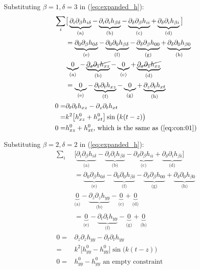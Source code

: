\documentclass[]{article}
\begin{document}
Substituting $\beta=1,\delta=3$ in (\ref{eq:expanded_h}):
\begin{align*}
	\sum_i&\big[\underbrace{\partial_i\partial_\beta h_{i\delta}}_\text{(a)} - \underbrace{\partial_i\partial_i h_{\beta\delta}}_\text{(b)} -  \underbrace{\partial_\delta\partial_\beta h_{ii}}_\text{(c)} + \underbrace{\partial_\delta\partial_i h_{\beta i}}_\text{(d)}\big]\\
	&=\underbrace{\partial_0\partial_\beta h_{0\delta}}_\text{(e)} - \underbrace{\partial_0\partial_0 h_{\beta\delta}}_\text{(f)} -  \underbrace{\partial_\delta\partial_\beta h_{00}}_\text{(g)} + \underbrace{\partial_\delta\partial_0 h_{\beta 0}}_\text{(h)}\\
	&\underbrace{0}_\text{(a)} - \underbrace{\cancel{\partial_z\partial_z h_{xz}}}_\text{(b)} -  \underbrace{0}_\text{(c)} + \underbrace{\cancel{\partial_z\partial_z h_{x z}}}_\text{(d)}\\
	&=\underbrace{0}_\text{(e)} - \underbrace{\partial_t\partial_t h_{xz}}_\text{(f)} -  \underbrace{0}_\text{(g)} + \underbrace{\partial_z\partial_t h_{xt}}_\text{(h)}\\
	0=&\partial_t\partial_t h_{xz}-\partial_z\partial_t h_{xt}\\
	=&k^2 \big[h^0_{xz}+h^0_{xt}\big] \sin\big(k(t-z)\big)\\
	0=&h^0_{xz}+h^0_{xt} \text{, which is the same as (\ref{eq:con:01})}
\end{align*}

Substituting $\beta=2,\delta=2$ in (\ref{eq:expanded_h}):
\begin{align*}
	\sum_i&\big[\underbrace{\partial_i\partial_\beta h_{i\delta}}_\text{(a)} - \underbrace{\partial_i\partial_i h_{\beta\delta}}_\text{(b)} -  \underbrace{\partial_\delta\partial_\beta h_{ii}}_\text{(c)} + \underbrace{\partial_\delta\partial_i h_{\beta i}}_\text{(d)}\big]\\
	&=\underbrace{\partial_0\partial_\beta h_{0\delta}}_\text{(e)} - \underbrace{\partial_0\partial_0 h_{\beta\delta}}_\text{(f)} -  \underbrace{\partial_\delta\partial_\beta h_{00}}_\text{(g)} + \underbrace{\partial_\delta\partial_0 h_{\beta 0}}_\text{(h)}\\
	&\underbrace{0}_\text{(a)} - \underbrace{\partial_z\partial_z h_{yy}}_\text{(b)} -  \underbrace{0}_\text{(c)} + \underbrace{0}_\text{(d)}\\
	&=\underbrace{0}_\text{(e)} - \underbrace{\partial_t\partial_t h_{yy}}_\text{(f)} -  \underbrace{0}_\text{(g)} + \underbrace{0}_\text{(h)}\\
	0=&\partial_z\partial_z h_{yy}-\partial_t\partial_t h_{yy}\\
	=&k^2 \big[h^0_{yy}-h^0_{yy}\big] \sin\big(k(t-z)\big) \\
	0=&h^0_{yy}-h^0_{yy} \text{ an empty constraint}
\end{align*}
\end{document}
